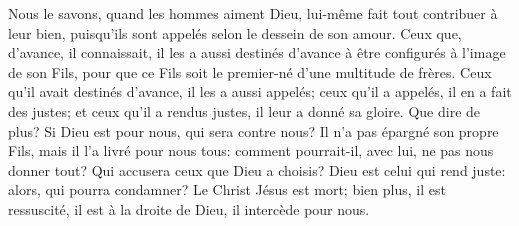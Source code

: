 Nous le savons, quand les hommes aiment Dieu,
	lui-même fait tout contribuer à leur bien,
	puisqu'ils sont appelés selon le dessein de son amour.
Ceux que, d’avance, il connaissait,
	il les a aussi destinés d’avance à être configurés à l’image de son Fils,
	pour que ce Fils soit le premier-né d’une multitude de frères.
Ceux qu’il avait destinés d’avance, il les a aussi appelés;
	ceux qu’il a appelés, il en a fait des justes;
	et ceux qu’il a rendus justes, il leur a donné sa gloire.
Que dire de plus? Si Dieu est pour nous, qui sera contre nous?
Il n’a pas épargné son propre Fils, mais il l’a livré pour nous tous:
	comment pourrait-il, avec lui, ne pas nous donner tout?
Qui accusera ceux que Dieu a choisis?
Dieu est celui qui rend juste: alors, qui pourra condamner?
Le Christ Jésus est mort;
	bien plus, il est ressuscité, il est à la droite de Dieu, il intercède pour nous.
